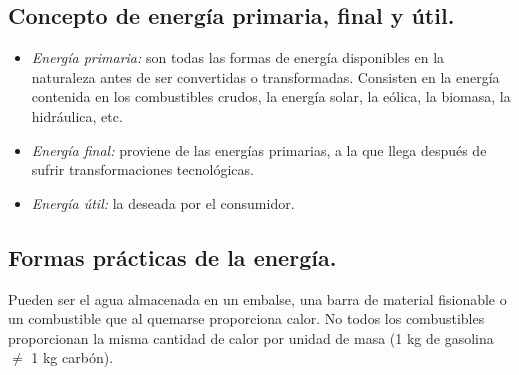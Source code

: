 		\subsection{Concepto de energía primaria, final y útil.}
			\begin{itemize}
				\item \textit{Energía primaria:} 
					son todas las formas de energía disponibles en la naturaleza antes de ser convertidas o transformadas. Consisten en la energía contenida en los combustibles crudos, la energía solar, la eólica, la biomasa, la hidráulica, etc.
				\item \textit{Energía final:}
					proviene de las energías primarias, a la que llega después de sufrir transformaciones tecnológicas.
				\item \textit{Energía útil:}
					la deseada por el consumidor.
			\end{itemize}
			
		
		\subsection{Formas prácticas de la energía.}
			Pueden ser el agua almacenada en un embalse, una barra de material fisionable o un combustible que al quemarse proporciona calor. No todos los combustibles proporcionan la misma cantidad de calor por unidad de masa (1 kg de gasolina $\neq$ 1 kg carbón).\\
			
